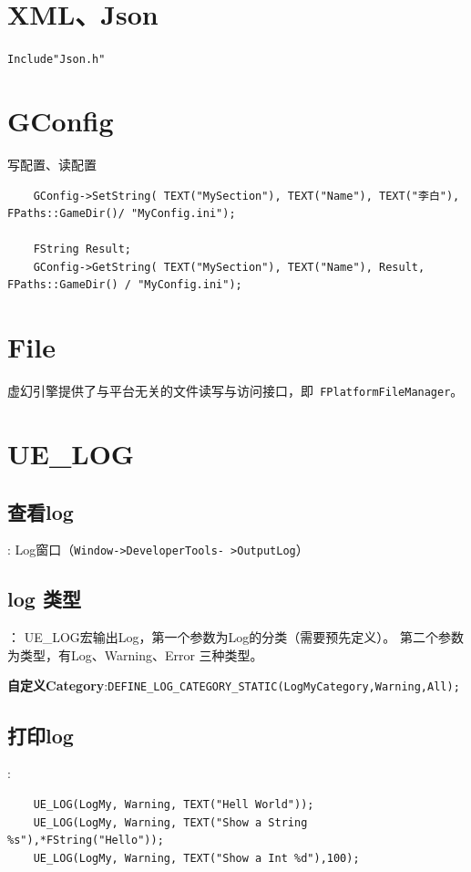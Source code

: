 \documentclass[UTF8,a4paper,12pt]{ctexbook}
\begin{document}
		
	\section{XML、Json}
		\verb|Include"Json.h"|
	
	\section{GConfig}
		写配置、读配置
		
		\begin{lstlisting}
	GConfig->SetString( TEXT("MySection"), TEXT("Name"), TEXT("李白"), FPaths::GameDir()/ "MyConfig.ini");
	
	FString Result; 
	GConfig->GetString( TEXT("MySection"), TEXT("Name"), Result, FPaths::GameDir() / "MyConfig.ini");
		\end{lstlisting}
	
	\section{File}
		虚幻引擎提供了与平台无关的文件读写与访问接口，即\verb| FPlatformFileManager|。
	
	\section{UE\_LOG}
		\subsection{查看log}:
			Log窗口（\verb|Window->DeveloperTools- >OutputLog|）
		
		\subsection{log 类型}：
			UE\_LOG宏输出Log，第一个参数为Log的分类（需要预先定义）。 第二个参数为类型，有Log、Warning、Error 三种类型。
			
			\textbf{自定义Category}:\verb|DEFINE_LOG_CATEGORY_STATIC(LogMyCategory,Warning,All);|
			
		\subsection{打印log}:
			\begin{lstlisting}
	UE_LOG(LogMy, Warning, TEXT("Hell World")); 
	UE_LOG(LogMy, Warning, TEXT("Show a String %s"),*FString("Hello")); 
	UE_LOG(LogMy, Warning, TEXT("Show a Int %d"),100);			
			\end{lstlisting}
			
\end{document}
